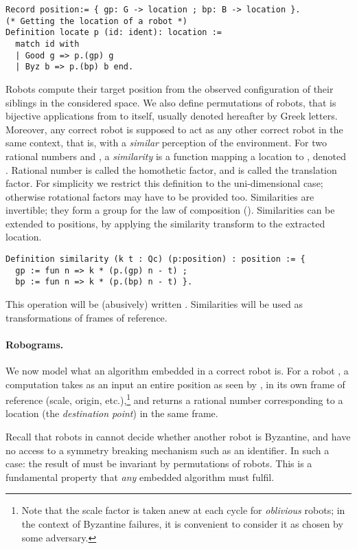 \documentclass[11pt,a4]{llncs}
\newcommand{\x}{\xspace}
\begin{document}
\begin{lstlisting}
Record position:= { gp: G -> location ; bp: B -> location }.
(* Getting the location of a robot *)
Definition locate p (id: ident): location :=
  match id with 
  | Good g => p.(gp) g 
  | Byz b => p.(bp) b end.
\end{lstlisting}

Robots compute their target position from the observed configuration of their
siblings in the considered space. We also define permutations of robots, that is bijective applications from  to itself, usually denoted hereafter by Greek
letters.
Moreover, any correct robot is supposed to act as any other correct
robot in the same context, that is, with a \emph{similar} perception
of the environment.
For two rational numbers  and , a \emph{similarity} is a
function mapping a location  to , denoted
. Rational number  is called the homothetic factor, and
 is called the translation factor. For
simplicity we restrict this definition to the uni-dimensional
case; otherwise rotational factors may have to be provided too.
Similarities are invertible; they form a group for the law of composition
().
Similarities can be extended to positions, by applying the similarity
transform to the extracted location.
\begin{lstlisting}
Definition similarity (k t : Qc) (p:position) : position := {
  gp := fun n => k * (p.(gp) n - t) ; 
  bp := fun n => k * (p.(bp) n - t) }.
\end{lstlisting}
This operation will be (abusively) written . Similarities will be used as transformations of frames of
reference.


\paragraph*{Robograms.}
We now model what an algorithm  embedded in a correct
robot is.
\newcommand{\robid}{\ensuremath{\textsl{r-id}\x}}
For a robot , a computation takes as an input an entire
position  as seen by , in its own frame of
reference (scale, origin, etc.),\footnote{Note that the scale factor is taken 
  anew at each cycle for \emph{oblivious} robots; in the context of Byzantine failures, it is
  convenient to consider it as chosen by some adversary.\label{foot:adversary}} and returns a rational number 
corresponding to a location (the \emph{destination point}) in the same frame.

\begin{remark}\label{rem:automorph}
  Recall that robots in  cannot decide whether another robot is
  Byzantine, and have no access to a symmetry breaking mechanism such
  as an identifier. In such a case: the result of  must be invariant by
  permutations of robots. This is a fundamental property that
  \emph{any} embedded algorithm must fulfil.
\end{remark}
\end{document}

